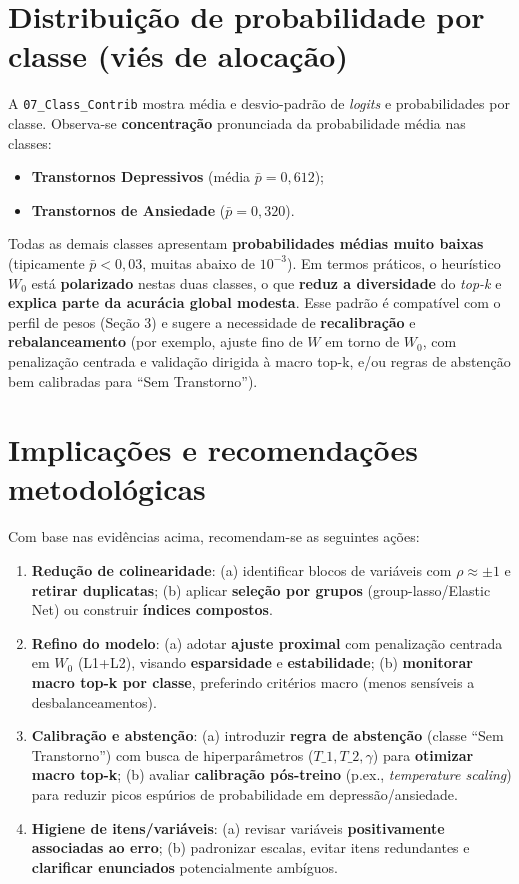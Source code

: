 \documentclass[12pt,a4paper]{article}
\begin{document}
\section{Distribuição de probabilidade por classe (viés de alocação)}
A \texttt{07\_Class\_Contrib} mostra média e desvio-padrão de \textit{logits} e probabilidades por classe. Observa-se \textbf{concentração} pronunciada da probabilidade média nas classes:
\begin{itemize}[leftmargin=1.2cm]
  \item \textbf{Transtornos Depressivos} (média $\bar{p}=0{,}612$);
  \item \textbf{Transtornos de Ansiedade} ($\bar{p}=0{,}320$).
\end{itemize}
Todas as demais classes apresentam \textbf{probabilidades médias muito baixas} (tipicamente $\bar{p} < 0{,}03$, muitas abaixo de $10^{-3}$). Em termos práticos, o heurístico $W_0$ está \textbf{polarizado} nestas duas classes, o que \textbf{reduz a diversidade} do \textit{top-k} e \textbf{explica parte da acurácia global modesta}. Esse padrão é compatível com o perfil de pesos (Seção 3) e sugere a necessidade de \textbf{recalibração} e \textbf{rebalanceamento} (por exemplo, ajuste fino de $W$ em torno de $W_0$, com penalização centrada e validação dirigida à macro top-k, e/ou regras de abstenção bem calibradas para ``Sem Transtorno'').

\section{Implicações e recomendações metodológicas}
Com base nas evidências acima, recomendam-se as seguintes ações:
\begin{enumerate}[leftmargin=1.2cm]
  \item \textbf{Redução de colinearidade}: (a) identificar blocos de variáveis com $\rho\approx\pm 1$ e \textbf{retirar duplicatas}; (b) aplicar \textbf{seleção por grupos} (group-lasso/Elastic Net) ou construir \textbf{índices compostos}.
  \item \textbf{Refino do modelo}: (a) adotar \textbf{ajuste proximal} com penalização centrada em $W_0$ (L1+L2), visando \textbf{esparsidade} e \textbf{estabilidade}; (b) \textbf{monitorar macro top-k por classe}, preferindo critérios macro (menos sensíveis a desbalanceamentos).
  \item \textbf{Calibração e abstenção}: (a) introduzir \textbf{regra de abstenção} (classe ``Sem Transtorno'') com busca de hiperparâmetros ($T\_1,T\_2,\gamma$) para \textbf{otimizar macro top-k}; (b) avaliar \textbf{calibração pós-treino} (p.ex., \textit{temperature scaling}) para reduzir picos espúrios de probabilidade em depressão/ansiedade.
  \item \textbf{Higiene de itens/variáveis}: (a) revisar variáveis \textbf{positivamente associadas ao erro}; (b) padronizar escalas, evitar itens redundantes e \textbf{clarificar enunciados} potencialmente ambíguos.
\end{enumerate}
\end{document}
